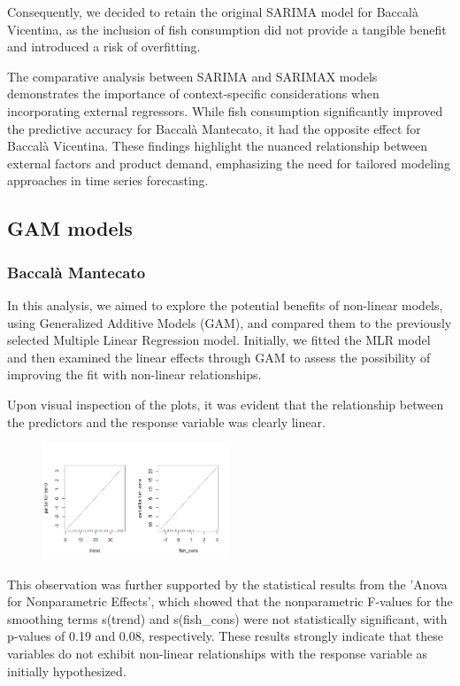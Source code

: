 \documentclass[10pt,twocolumn,letterpaper]{article}
\begin{document}
Consequently, we decided to retain the original SARIMA model for Baccalà Vicentina, as the inclusion of fish consumption did not provide a tangible benefit and introduced a risk of overfitting.


The comparative analysis between SARIMA and SARIMAX models demonstrates the importance of context-specific considerations when incorporating external regressors. While fish consumption significantly improved the predictive accuracy for Baccalà Mantecato, it had the opposite effect for Baccalà Vicentina. These findings highlight the nuanced relationship between external factors and product demand, emphasizing the need for tailored modeling approaches in time series forecasting.

\subsection{GAM models}
\subsubsection{Baccalà Mantecato}
In this analysis, we aimed to explore the potential benefits of non-linear models, using Generalized Additive Models (GAM), and compared them to the previously selected Multiple Linear Regression model. Initially, we fitted the MLR model and then examined the linear effects through GAM to assess the possibility of improving the fit with non-linear relationships.

Upon visual inspection of the plots, it was evident that the relationship between the predictors and the response variable was clearly linear. 
\begin{figure}[H]
    \centering
    \includegraphics[width=0.5\textwidth]{PlotsBEFD/GAM_M_LINEARITY.png} 
    \caption{}
    \label{fig:esempio}
\end{figure}
This observation was further supported by the statistical results from the 'Anova for Nonparametric Effects', which showed that the nonparametric F-values for the smoothing terms s(trend) and s(fish\_cons) were not statistically significant, with p-values of 0.19 and 0.08, respectively.
These results strongly indicate that these variables do not exhibit non-linear relationships with the response variable as initially hypothesized.
\end{document}
